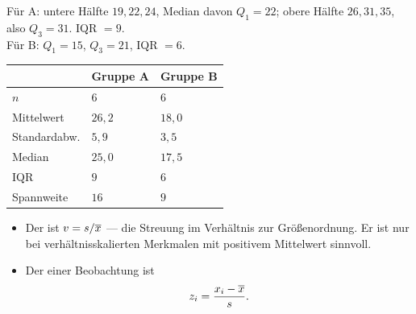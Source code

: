 \begin{merksatz}
Für A: untere Hälfte $19,22,24$, Median davon $Q_1 = 22$; obere Hälfte $26,31,35$, also $Q_3 = 31$. IQR $= 9$.\\
Für B: $Q_1 = 15$, $Q_3 = 21$, IQR $= 6$.

\begin{center}
{\small
\renewcommand{\arraystretch}{1.45}
\begin{tabular}{@{}P{2.6cm}P{2.2cm}P{2.2cm}@{}}
\toprule
& \textbf{Gruppe A} & \textbf{Gruppe B}\\
\midrule
$n$ & $6$ & $6$\\
Mittelwert & $26{,}2$ & $18{,}0$\\
Standardabw. & $5{,}9$ & $3{,}5$\\
Median & $25{,}0$ & $17{,}5$\\
IQR & $9$ & $6$\\
Spannweite & $16$ & $9$\\
\bottomrule
\end{tabular}}
\end{center}

\begin{center}
\begin{minipage}{0.88\textwidth}
\end{minipage}
\end{center}
\end{merksatz}

\begin{definition}
\begin{itemize}[leftmargin=1.4em, itemsep=4pt]
\item Der  ist $v = s/\overline{x}$ --- die Streuung im Verhältnis zur Größenordnung. Er ist nur bei verhältnisskalierten Merkmalen mit positivem Mittelwert sinnvoll.
\item Der  einer Beobachtung ist
\[ z_i = \frac{x_i - \overline{x}}{s} . \]
\end{itemize}
\end{definition}

